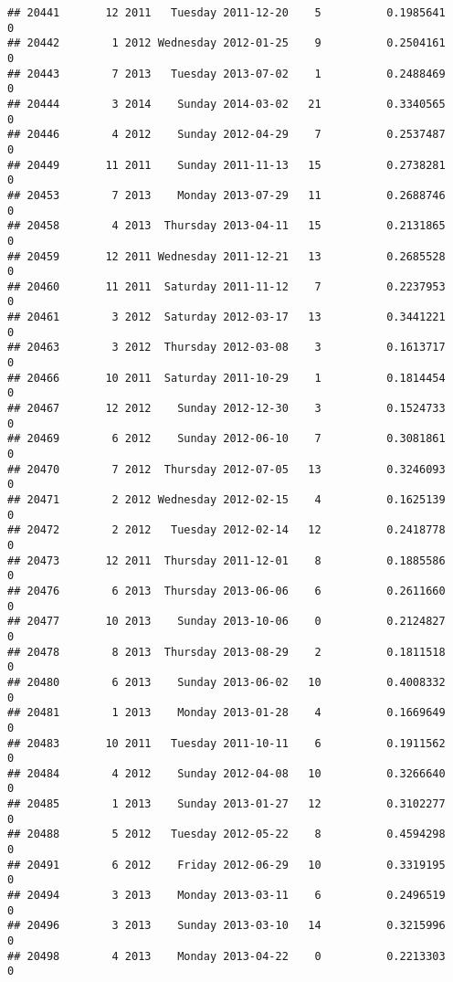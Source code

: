 \documentclass[
]{article}
\begin{document}
\begin{verbatim}
## 20441       12 2011   Tuesday 2011-12-20    5          0.1985641             0
## 20442        1 2012 Wednesday 2012-01-25    9          0.2504161             0
## 20443        7 2013   Tuesday 2013-07-02    1          0.2488469             0
## 20444        3 2014    Sunday 2014-03-02   21          0.3340565             0
## 20446        4 2012    Sunday 2012-04-29    7          0.2537487             0
## 20449       11 2011    Sunday 2011-11-13   15          0.2738281             0
## 20453        7 2013    Monday 2013-07-29   11          0.2688746             0
## 20458        4 2013  Thursday 2013-04-11   15          0.2131865             0
## 20459       12 2011 Wednesday 2011-12-21   13          0.2685528             0
## 20460       11 2011  Saturday 2011-11-12    7          0.2237953             0
## 20461        3 2012  Saturday 2012-03-17   13          0.3441221             0
## 20463        3 2012  Thursday 2012-03-08    3          0.1613717             0
## 20466       10 2011  Saturday 2011-10-29    1          0.1814454             0
## 20467       12 2012    Sunday 2012-12-30    3          0.1524733             0
## 20469        6 2012    Sunday 2012-06-10    7          0.3081861             0
## 20470        7 2012  Thursday 2012-07-05   13          0.3246093             0
## 20471        2 2012 Wednesday 2012-02-15    4          0.1625139             0
## 20472        2 2012   Tuesday 2012-02-14   12          0.2418778             0
## 20473       12 2011  Thursday 2011-12-01    8          0.1885586             0
## 20476        6 2013  Thursday 2013-06-06    6          0.2611660             0
## 20477       10 2013    Sunday 2013-10-06    0          0.2124827             0
## 20478        8 2013  Thursday 2013-08-29    2          0.1811518             0
## 20480        6 2013    Sunday 2013-06-02   10          0.4008332             0
## 20481        1 2013    Monday 2013-01-28    4          0.1669649             0
## 20483       10 2011   Tuesday 2011-10-11    6          0.1911562             0
## 20484        4 2012    Sunday 2012-04-08   10          0.3266640             0
## 20485        1 2013    Sunday 2013-01-27   12          0.3102277             0
## 20488        5 2012   Tuesday 2012-05-22    8          0.4594298             0
## 20491        6 2012    Friday 2012-06-29   10          0.3319195             0
## 20494        3 2013    Monday 2013-03-11    6          0.2496519             0
## 20496        3 2013    Sunday 2013-03-10   14          0.3215996             0
## 20498        4 2013    Monday 2013-04-22    0          0.2213303             0

\end{verbatim}
\end{document}
